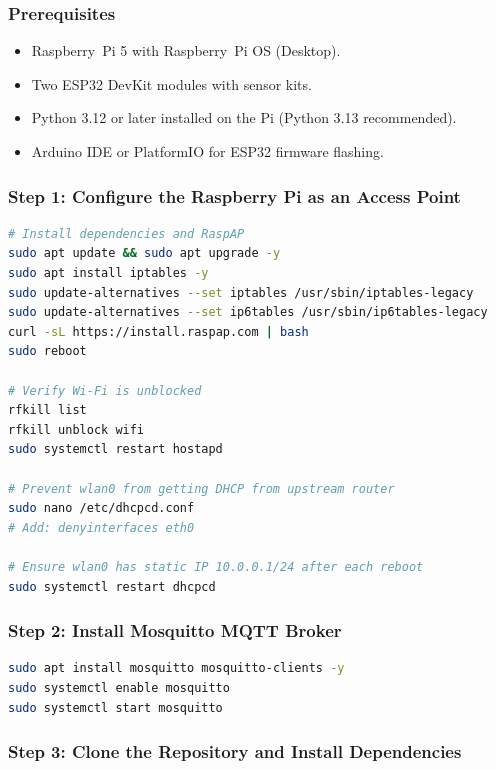 \documentclass[12pt,a4paper]{article}
\begin{document}
\subsubsection*{Prerequisites}
\begin{itemize}
    \item Raspberry~Pi 5 with Raspberry~Pi OS (Desktop).
    \item Two ESP32 DevKit modules with sensor kits.
    \item Python 3.12 or later installed on the Pi (Python 3.13 recommended).
    \item Arduino IDE or PlatformIO for ESP32 firmware flashing.
\end{itemize}

\subsubsection*{Step 1: Configure the Raspberry Pi as an Access Point}

\begin{lstlisting}[language=bash]
# Install dependencies and RaspAP
sudo apt update && sudo apt upgrade -y
sudo apt install iptables -y
sudo update-alternatives --set iptables /usr/sbin/iptables-legacy
sudo update-alternatives --set ip6tables /usr/sbin/ip6tables-legacy
curl -sL https://install.raspap.com | bash
sudo reboot

# Verify Wi-Fi is unblocked
rfkill list
rfkill unblock wifi
sudo systemctl restart hostapd

# Prevent wlan0 from getting DHCP from upstream router
sudo nano /etc/dhcpcd.conf
# Add: denyinterfaces eth0

# Ensure wlan0 has static IP 10.0.0.1/24 after each reboot
sudo systemctl restart dhcpcd
\end{lstlisting}

\subsubsection*{Step 2: Install Mosquitto MQTT Broker}

\begin{lstlisting}[language=bash]
sudo apt install mosquitto mosquitto-clients -y
sudo systemctl enable mosquitto
sudo systemctl start mosquitto
\end{lstlisting}

\subsubsection*{Step 3: Clone the Repository and Install Dependencies}
\end{document}
